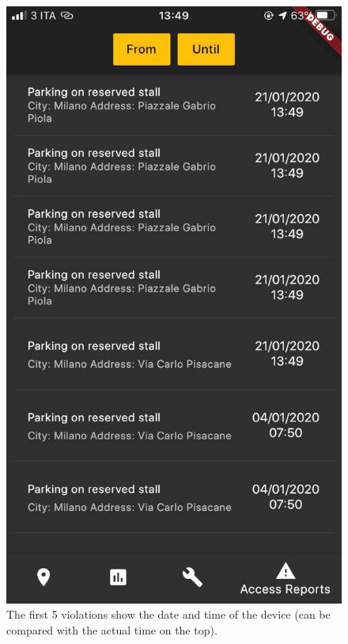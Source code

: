 \documentclass[../ATD.tex]{subfiles}
\begin{document}
    \begin{figure}[H]
        \centering
        \includegraphics[scale = 0.15]{assets/access_report_municipality.png}
        \caption[Violation manipulation]{The first 5 violations show the date and time of the device (can be compared with the actual time on the top).}
    \end{figure}
\end{document}
